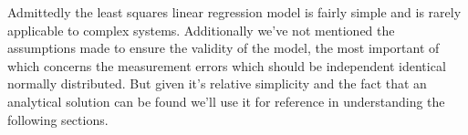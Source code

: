 Admittedly the least squares linear regression model is fairly simple and is rarely applicable to complex systems. Additionally we've not mentioned the assumptions made to ensure the validity of the model, the most important of which concerns the measurement errors which should be independent identical normally distributed. But given it's relative simplicity and the fact that an analytical solution can be found we'll use it for reference in understanding the following sections.




